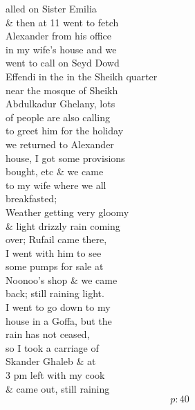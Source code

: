 \documentclass{report}
\begin{document}
	\par{
 	alled on Sister Emilia\ \\\& then at 11 went to fetch\ \\Alexander from his office\ \\in my wife's house and we\ \\went to call on Seyd Dowd\ \\Effendi in the in the Sheikh quarter\ \\near the mosque of Sheikh\ \\Abdulkadur Ghelany, lots\ \\of people are also calling\ \\to greet him for the holiday\ \\we returned to Alexander\ \\house, I got some provisions\ \\bought, etc \& we came\ \\to my wife where we all\ \\breakfasted;\ \\Weather getting very gloomy\ \\\& light drizzly rain coming\ \\over; Rufail came there,\ \\I went with him to see\ \\some pumps for sale at\ \\Noonoo's shop \& we came\ \\back; still raining light.\ \\I went to go down to my\ \\house in a Goffa, but the\ \\rain has not ceased,\ \\so I took a carriage of\ \\Skander Ghaleb \& at\ \\3 pm left with my cook\ \\\& came out, still raining\ \\
  \[p: 40 \]

	}

\end{document}
